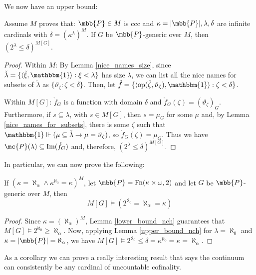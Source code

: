 We now have an upper bound:

\begin{lemma}{}{}\label{upper_bound_nch}
    Assume $M$ proves that: $\mbb{P}\in M$ is ccc and $\kappa=\lvert\mbb{P}\rvert,\lambda,\delta$ are infinite cardinals with $\delta=(\kappa^\lambda)^M$. If $G$ be $\mbb{P}$-generic over $M$, then $(2^\lambda\leq\delta)^{M[G]}$.
\end{lemma}

\begin{proof}
    Within $M$: By Lemma \ref{nice_names_size}, since $\check{\lambda}=\{\langle\check{\xi},\mathbbm{1}\rangle:\xi<\lambda\}$ has size $\lambda$, we can list all the nice names for subsets of $\check{\lambda}$ as $\{\vartheta_\zeta:\zeta<\delta\}$. Then, let $\mathring{f}=\{\langle\text{op}(\check{\zeta},\vartheta_\zeta),\mathbbm{1}\rangle:\zeta<\delta\}$.

    Within $M[G]$: $\mathring{f}_G$ is a function with domain $\delta$ and $\mathring{f}_G(\zeta)=(\vartheta_\zeta)_G$. Furthermore, if $s\subseteq\lambda$, with $s\in M[G]$, then $s=\mu_G$ for some $\mu$ and, by Lemma \ref{nice_names_for_subsets}, there is some $\zeta$ such that $\mathbbm{1}\Vdash(\mu\subseteq\check{\lambda}\to\mu=\vartheta_\zeta)$, so $\mathring{f}_G(\zeta)=\mu_G$. Thus we have $\mc{P}(\lambda)\subseteq\text{Im}(\mathring{f}_G)$ and, therefore, $(2^\lambda\leq\delta)^{M[G]}$.
\end{proof}

In particular, we can now prove the following:

\begin{theorem}{}{}
    If $(\kappa=\aleph_\alpha\wedge\kappa^{\aleph_0}=\kappa)^M$, let $\mbb{P}=\text{Fn}(\kappa\times\omega,2)$ and let $G$ be $\mbb{P}$-generic over $M$, then
    $$M[G]\vDash(2^{\aleph_0}=\aleph_\alpha=\kappa)$$
\end{theorem}

\begin{proof}
    Since $\kappa=(\aleph_\alpha)^M$, Lemma \ref{lower_bound_nch} guarantees that $M[G]\vDash2^{\aleph_0}\geq\aleph_\alpha$. Now, applying Lemma \ref{upper_bound_nch} for $\lambda=\aleph_0$ and $\kappa=\lvert\mbb{P}\rvert=\aleph_\alpha$, we have $M[G]\vDash2^{\aleph_0}\leq\delta=\kappa^{\aleph_0}=\kappa=\aleph_\alpha$.
\end{proof}

As a corollary we can prove a really interesting result that says the continuum can consistently be any cardinal of uncountable cofinality.

